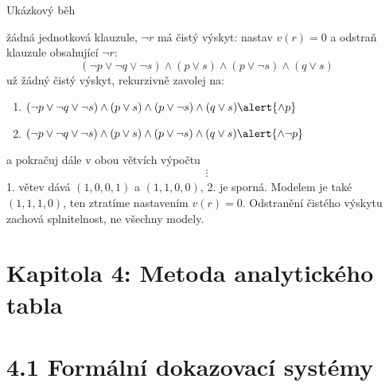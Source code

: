 \documentclass{beamer}
\begin{document}
\begin{frame}{Ukázkový běh}

    \pause
    žádná jednotková klauzule, $\neg r$ má \alert{čistý výskyt}: nastav  $v(r)=0$ a odstraň klauzule obsahující $\neg r$:\pause
    $$
    (\neg p\lor\neg q\lor\neg s)\land (p\lor s)\land(p\lor\neg s)\land(q\lor s)
    $$
    \pause
    už žádný čistý výskyt, rekurzivně zavolej na:
    \begin{enumerate}
        \item $(\neg p\lor\neg q\lor\neg s)\land (p\lor s)\land(p\lor\neg s)\land(q\lor s)\alert{\land p}$
        \item $(\neg p\lor\neg q\lor\neg s)\land (p\lor s)\land(p\lor\neg s)\land(q\lor s)\alert{\land \neg p}$
    \end{enumerate}
    \pause
    a pokračuj dále v obou větvích výpočtu \pause
    \begin{gather*}
        \vdots
    \end{gather*}
    1. větev dává $(1,0,0,1)$ a $(1,1,0,0)$, 2. je sporná. Modelem je také $(1,1,1,0)$, ten ztratíme nastavením $v(r)=0$. \alert{Odstranění čistého výskytu zachová splnitelnost, ne všechny modely.}
    
\end{frame}


\section{\sc Kapitola 4: Metoda analytického tabla}


\section{4.1 Formální dokazovací systémy}
\end{document}
